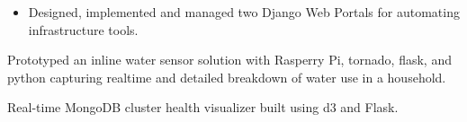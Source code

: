 \documentclass[10pt,a4paper,academicons]{altacv}
\begin{document}
\divider

\begin{itemize}
\item Designed, implemented and managed two Django Web Portals for automating infrastructure tools.
\end{itemize}


Prototyped an inline water sensor solution with Rasperry Pi, tornado, flask, and python capturing realtime and detailed breakdown of water use in a household.

\divider

Real-time MongoDB cluster health visualizer built using d3 and Flask.

\medskip
\end{document}
